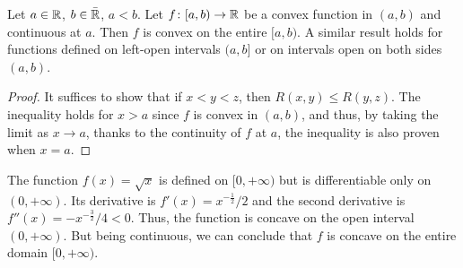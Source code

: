 \begin{theorem}
Let $a\in {\mathbb R}$, $b\in \bar {{\mathbb R}}$, $a<b$.
Let $f\colon [a,b)\to {\mathbb R}$ be a convex function 
in $(a,b)$ and continuous at $a$. 
Then $f$ is convex on the entire $[a,b)$. 
A similar result holds for functions defined on 
left-open intervals $(a,b]$
or on intervals open on both sides $(a,b)$.
\end{theorem}
%
\begin{proof}
It suffices to show that if $x<y<z$, then $R(x,y)\le R(y,z)$.
The inequality holds for $x>a$ since $f$ is convex 
in $(a,b)$, and thus, by taking the limit as $x\to a$, 
thanks to the continuity of $f$ at $a$,
the inequality is also proven when $x=a$.
\end{proof}

\begin{example}
The function $f(x) = \sqrt{x}$ is defined on $[0,+\infty)$ but is differentiable
only on $(0,+\infty)$. Its derivative is $f'(x) = x^{-\frac 1 2 }/2$ and the
second derivative is $f''(x) = -x^{-\frac 3 2}/4 < 0$. Thus, the function is
concave on the open interval $(0,+\infty)$. But being continuous, we can
conclude that $f$ is concave on the entire domain $[0,+\infty)$.
\end{example}

